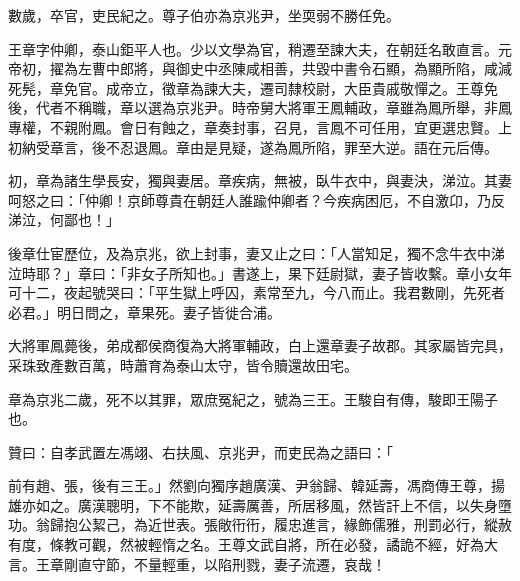 \begin{pinyinscope}
數歲，卒官，吏民紀之。尊子伯亦為京兆尹，坐耎弱不勝任免。

王章字仲卿，泰山鉅平人也。少以文學為官，稍遷至諫大夫，在朝廷名敢直言。元帝初，擢為左曹中郎將，與御史中丞陳咸相善，共毀中書令石顯，為顯所陷，咸減死髡，章免官。成帝立，徵章為諫大夫，遷司隸校尉，大臣貴戚敬憚之。王尊免後，代者不稱職，章以選為京兆尹。時帝舅大將軍王鳳輔政，章雖為鳳所舉，非鳳專權，不親附鳳。會日有蝕之，章奏封事，召見，言鳳不可任用，宜更選忠賢。上初納受章言，後不忍退鳳。章由是見疑，遂為鳳所陷，罪至大逆。語在元后傳。

初，章為諸生學長安，獨與妻居。章疾病，無被，臥牛衣中，與妻決，涕泣。其妻呵怒之曰：「仲卿！京師尊貴在朝廷人誰踰仲卿者？今疾病困厄，不自激卬，乃反涕泣，何鄙也！」

後章仕宦歷位，及為京兆，欲上封事，妻又止之曰：「人當知足，獨不念牛衣中涕泣時耶？」章曰：「非女子所知也。」書遂上，果下廷尉獄，妻子皆收繫。章小女年可十二，夜起號哭曰：「平生獄上呼囚，素常至九，今八而止。我君數剛，先死者必君。」明日問之，章果死。妻子皆徙合浦。

大將軍鳳薨後，弟成都侯商復為大將軍輔政，白上還章妻子故郡。其家屬皆完具，采珠致產數百萬，時蕭育為泰山太守，皆令贖還故田宅。

章為京兆二歲，死不以其罪，眾庶冤紀之，號為三王。王駿自有傳，駿即王陽子也。

贊曰：自孝武置左馮翊、右扶風、京兆尹，而吏民為之語曰：「

前有趙、張，後有三王。」然劉向獨序趙廣漢、尹翁歸、韓延壽，馮商傳王尊，揚雄亦如之。廣漢聰明，下不能欺，延壽厲善，所居移風，然皆訐上不信，以失身墮功。翁歸抱公絜己，為近世表。張敞衎衎，履忠進言，緣飾儒雅，刑罰必行，縱赦有度，條教可觀，然被輕惰之名。王尊文武自將，所在必發，譎詭不經，好為大言。王章剛直守節，不量輕重，以陷刑戮，妻子流遷，哀哉！


\end{pinyinscope}